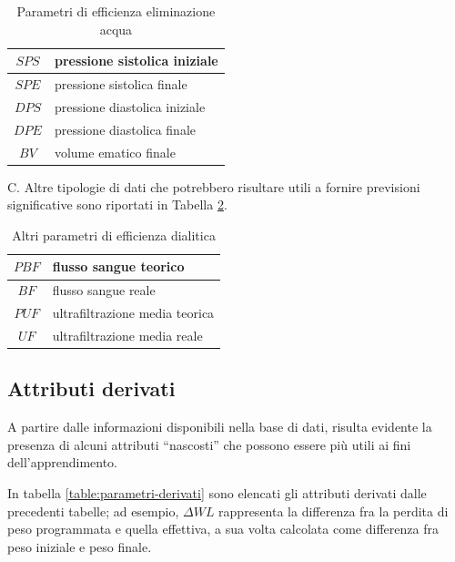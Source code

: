 \documentclass[preprint]{acm_proc_article-sp}
\begin{document}
\begin{table}[h]
\centering
\begin{tabular}{|c|l|} \hline
$SPS$ & pressione sistolica iniziale \\ \hline
$SPE$ & pressione sistolica finale \\ \hline
$DPS$ & pressione diastolica iniziale\\ \hline
$DPE$ & pressione diastolica finale\\ \hline
$BV$ & volume ematico finale\\
\hline\end{tabular}
\caption{Parametri di efficienza eliminazione acqua}
\label{table:parametri-2}
\end{table}

C. Altre tipologie di dati che potrebbero risultare utili a fornire previsioni significative sono riportati in Tabella \ref{table:parametri-3}.

\begin{table}[h]
\centering
\begin{tabular}{|c|l|} \hline
$PBF$ & flusso sangue teorico\\ \hline
$BF$ & flusso sangue reale\\ \hline
$PUF$ & ultrafiltrazione media teorica\\ \hline
$UF$ & ultrafiltrazione media reale\\
\hline\end{tabular}
\caption{Altri parametri di efficienza dialitica}
\label{table:parametri-3}
\end{table}

\subsection{Attributi derivati}\label{attributi-derivati}
A partire dalle informazioni disponibili nella base di dati, risulta evidente la presenza di alcuni attributi ``nascosti'' che possono essere più utili ai fini dell'apprendimento.

In tabella \ref{table:parametri-derivati} sono elencati gli attributi derivati dalle precedenti tabelle; ad esempio, $\Delta WL$ rappresenta la differenza fra la perdita di peso programmata e quella effettiva, a sua volta calcolata come differenza fra peso iniziale e peso finale.
\end{document}
